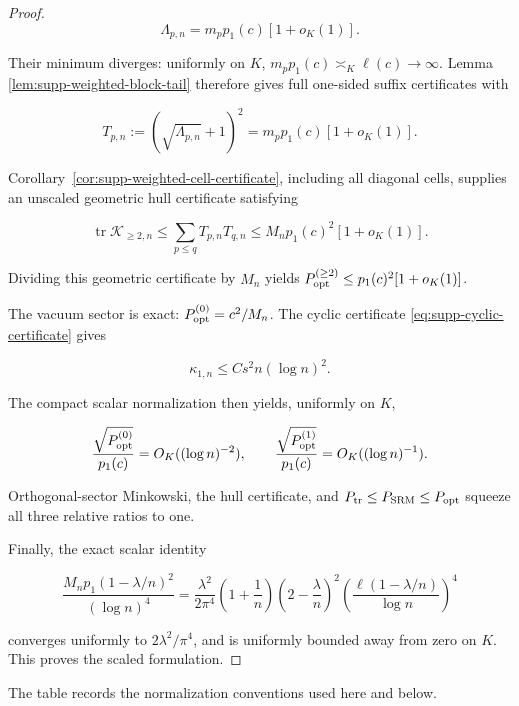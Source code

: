 \begin{proof}
\[
 \Lambda_{p,n}=m_pp_1(c)[1+o_K(1)].
\]

Their minimum diverges: uniformly on \(K\),
\(m_pp_1(c)\asymp_K\ell(c)\to\infty\).  Lemma
\ref{lem:supp-weighted-block-tail} therefore gives full one-sided suffix
certificates with

\[
 T_{p,n}:=(\sqrt{\Lambda_{p,n}}+1)^2
 =m_pp_1(c)[1+o_K(1)].
\]

Corollary~\ref{cor:supp-weighted-cell-certificate}, including all diagonal
cells, supplies an unscaled geometric hull certificate satisfying

\[
 \operatorname{tr}\mathcal K_{\ge2,n}
 \le\sum_{p\le q}T_{p,n}T_{q,n}
 \le M_np_1(c)^2[1+o_K(1)].
\]

Dividing this geometric certificate by \(M_n\) yields
\(P_{\rm opt}^{(\ge2)}\le p_1(c)^2[1+o_K(1)]\).

The vacuum sector is exact:
\(P_{\rm opt}^{(0)}=c^2/M_n\).  The cyclic certificate
\eqref{eq:supp-cyclic-certificate} gives

\[
 \kappa_{1,n}\le C s^2n(\log n)^2.
\]

The compact scalar normalization then yields, uniformly on \(K\),

\[
 \frac{\sqrt{P_{\rm opt}^{(0)}}}{p_1(c)}
 =O_K((\log n)^{-2}),\qquad
 \frac{\sqrt{P_{\rm opt}^{(1)}}}{p_1(c)}
 =O_K((\log n)^{-1}).
\]

Orthogonal-sector Minkowski, the hull certificate, and
\(P_{\rm tr}\le P_{\rm SRM}\le P_{\rm opt}\) squeeze all three relative
ratios to one.

Finally, the exact scalar identity

\[
 \frac{M_np_1(1-\lambda/n)^2}{(\log n)^4}
 =\frac{\lambda^2}{2\pi^4}
 \left(1+\frac1n\right)
 \left(2-\frac{\lambda}{n}\right)^2
 \left(\frac{\ell(1-\lambda/n)}{\log n}\right)^4
\]

converges uniformly to \(2\lambda^2/\pi^4\), and is uniformly bounded
away from zero on \(K\). This proves the scaled formulation.
\end{proof}

The table records the normalization conventions used here and below.

